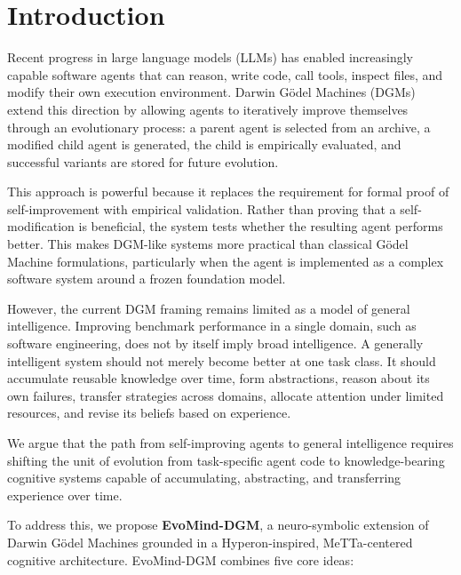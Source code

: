 \documentclass[11pt]{article}
\begin{document}
\section{Introduction}

Recent progress in large language models (LLMs) has enabled increasingly capable software agents that can reason, write code, call tools, inspect files, and modify their own execution environment. Darwin G\"odel Machines (DGMs) extend this direction by allowing agents to iteratively improve themselves through an evolutionary process: a parent agent is selected from an archive, a modified child agent is generated, the child is empirically evaluated, and successful variants are stored for future evolution.

This approach is powerful because it replaces the requirement for formal proof of self-improvement with empirical validation. Rather than proving that a self-modification is beneficial, the system tests whether the resulting agent performs better. This makes DGM-like systems more practical than classical G\"odel Machine formulations, particularly when the agent is implemented as a complex software system around a frozen foundation model.

However, the current DGM framing remains limited as a model of general intelligence. Improving benchmark performance in a single domain, such as software engineering, does not by itself imply broad intelligence. A generally intelligent system should not merely become better at one task class. It should accumulate reusable knowledge over time, form abstractions, reason about its own failures, transfer strategies across domains, allocate attention under limited resources, and revise its beliefs based on experience.

We argue that the path from self-improving agents to general intelligence requires shifting the unit of evolution from task-specific agent code to knowledge-bearing cognitive systems capable of accumulating, abstracting, and transferring experience over time.

To address this, we propose \textbf{EvoMind-DGM}, a neuro-symbolic extension of Darwin G\"odel Machines grounded in a Hyperon-inspired, MeTTa-centered cognitive architecture. EvoMind-DGM combines five core ideas:
\end{document}
